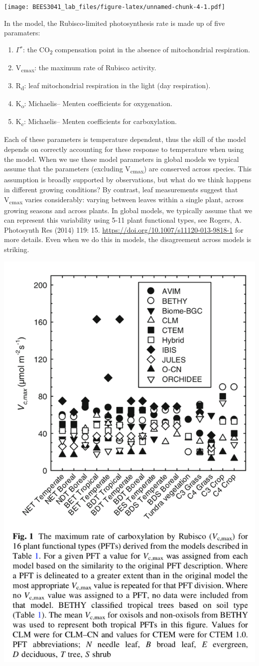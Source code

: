 \documentclass[]{article}
\providecommand{\tightlist}{%
  \setlength{\itemsep}{0pt}\setlength{\parskip}{0pt}}
\begin{document}
\texttt{[image: BEES3041\_lab\_files/figure-latex/unnamed-chunk-4-1.pdf]}

In the model, the Rubisco-limited photosynthesis rate is made up of five
paramaters:

\begin{enumerate}
\def\labelenumi{\arabic{enumi}.}
\tightlist
\item
  \(\Gamma\)\(^{*}\): the CO\textsubscript{2} compensation point in the
  absence of mitochondrial respiration.
\item
  V\textsubscript{cmax}: the maximum rate of Rubisco activity.
\item
  R\textsubscript{d}: leaf mitochondrial respiration in the light (day
  respiration).
\item
  K\textsubscript{o}: Michaelis-- Menten coefficients for oxygenation.
\item
  K\textsubscript{c}: Michaelis-- Menten coefficients for carboxylation.
\end{enumerate}

Each of these parameters is temperature dependent, thus the skill of the
model depends on correctly accounting for these response to temperature
when using the model. When we use these model parameters in global
models we typical assume that the parameters (excluding
V\textsubscript{cmax}) are conserved across species. This assumption is
broadly supported by observations, but what do we think happens in
different growing conditions? By contrast, leaf measurements suggest
that V\textsubscript{cmax} varies considerably: varying between leaves
within a single plant, across growing seasons and across plants. In
global models, we typically assume that we can represent this
variability using 5-11 plant functional types, see Rogers, A. Photosynth
Res (2014) 119: 15. \url{https://doi.org/10.1007/s11120-013-9818-1} for
more details. Even when we do this in models, the disagreement across
models is striking.

\begin{center}\includegraphics[width=0.4\linewidth]{data/rogers} \end{center}
\end{document}

